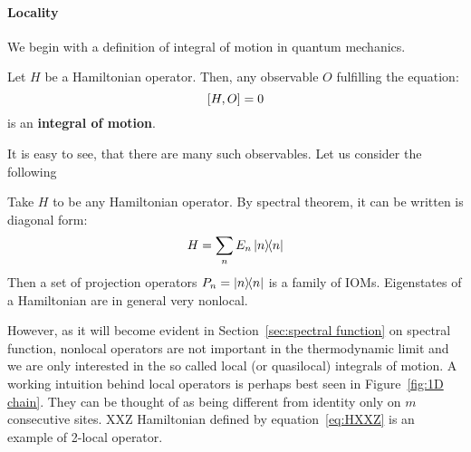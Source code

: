 \paragraph{Locality} We begin with a definition of integral of motion in quantum mechanics.
\begin{definition}
  Let \(H\) be a Hamiltonian operator. Then, any observable \(O\) fulfilling the equation:
  \[
    \comm{H}{O} = 0
  \]
  is an \textbf{integral of motion}.\label{def:iom}
\end{definition}
It is easy to see, that there are many such observables. Let us consider the following
\begin{example}
  Take \(H\) to be any Hamiltonian operator. By spectral theorem, it can be written is diagonal form:
  \begin{equation*}
    H = \sum_n E_n \ketbra{n}{n}
  \end{equation*}
  Then a set of projection operators \(P_n = \ketbra{n}{n}\) is a family of IOMs.
  Eigenstates of a Hamiltonian are in general very nonlocal. \label{ex: projectors}
\end{example}
However, as it will become evident in Section~\ref{sec:spectral function} on spectral function, nonlocal operators are not important in the
thermodynamic limit and we are only interested in the so called local (or quasilocal) integrals of motion.
A working intuition behind local operators is perhaps best seen in Figure~\ref{fig:1D chain}. They can be thought of as
being different from identity only on \(m\) consecutive sites. XXZ Hamiltonian defined by equation~\eqref{eq:HXXZ} is an
example of 2-local operator.

